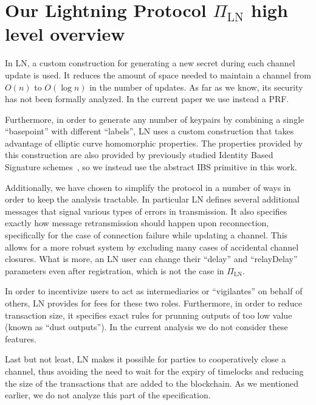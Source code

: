 \section{Our Lightning Protocol $\Pi_{\mathrm{LN}}$ high level overview}

  \begin{remark}

    In LN, a custom construction for generating a new secret during each channel
    update is used. It reduces the amount of space needed to maintain a channel
    from $O(n)$ to $O(\log n)$ in the number of updates. As far as we know, its
    security has not been formally analyzed. In the current paper we use instead
    a PRF.

    Furthermore, in order to generate any number of keypairs by combining a
    single ``basepoint'' with different ``labels'', LN uses a custom
    construction that takes advantage of elliptic curve homomorphic properties.
    The properties provided by this construction are also provided by previously
    studied Identity Based Signature schemes~\cite{ibsshamir,ibspaterson}, so we
    instead use the abstract IBS primitive in this work. 

    Additionally, we have chosen to simplify the protocol in a number of ways in
    order to keep the analysis tractable. In particular LN defines several
    additional messages that signal various types of errors in transmission. It
    also specifies exactly how message retransmission should happen upon
    reconnection, specifically for the case of connection failure while updating
    a channel. This allows for a more robust system by excluding many cases of
    accidental channel closures. What is more, an LN user can change their
    ``delay'' and ``relayDelay'' parameters even after registration, which is
    not the case in $\Pi_{\mathrm{LN}}$.

    In order to incentivize users to act as intermediaries or ``vigilantes'' on
    behalf of others, LN provides for fees for these two roles. Furthermore, in
    order to reduce transaction size, it specifies exact rules for prunning
    outputs of too low value (known as ``dust outputs''). In the current
    analysis we do not consider these features.

    Last but not least, LN makes it possible for parties to cooperatively close
    a channel, thus avoiding the need to wait for the expiry of timelocks and
    reducing the size of the transactions that are added to the blockchain. As
    we mentioned earlier, we do not analyze this part of the specification.
  \end{remark}
